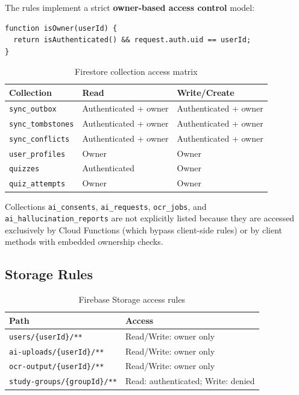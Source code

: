 \documentclass[12pt,a4paper,openany]{report}
\begin{document}
The rules implement a strict \textbf{owner-based access control} model:

\begin{verbatim}
function isOwner(userId) {
  return isAuthenticated() && request.auth.uid == userId;
}
\end{verbatim}

\begin{table}[H]
\centering
\caption{Firestore collection access matrix}
\label{tab:firestore-rules}
\begin{tabular}{lll}
\toprule
\textbf{Collection} & \textbf{Read} & \textbf{Write/Create} \\
\midrule
\texttt{sync\_outbox} & Authenticated + owner & Authenticated + owner \\
\texttt{sync\_tombstones} & Authenticated + owner & Authenticated + owner \\
\texttt{sync\_conflicts} & Authenticated + owner & Authenticated + owner \\
\texttt{user\_profiles} & Owner & Owner \\
\texttt{quizzes} & Authenticated & Owner \\
\texttt{quiz\_attempts} & Owner & Owner \\
\bottomrule
\end{tabular}
\end{table}

Collections \texttt{ai\_consents}, \texttt{ai\_requests}, \texttt{ocr\_jobs}, and \texttt{ai\_hallucination\_reports} are not explicitly listed because they are accessed exclusively by Cloud Functions (which bypass client-side rules) or by client methods with embedded ownership checks.

\subsection{Storage Rules}

\begin{table}[H]
\centering
\caption{Firebase Storage access rules}
\label{tab:storage-rules}
\begin{tabular}{ll}
\toprule
\textbf{Path} & \textbf{Access} \\
\midrule
\texttt{users/\{userId\}/**}& Read/Write: owner only \\
\texttt{ai-uploads/\{userId\}/**}& Read/Write: owner only \\
\texttt{ocr-output/\{userId\}/**}& Read/Write: owner only \\
\texttt{study-groups/\{groupId\}/**}& Read: authenticated; Write: denied \\
\bottomrule
\end{tabular}
\end{table}
\end{document}
